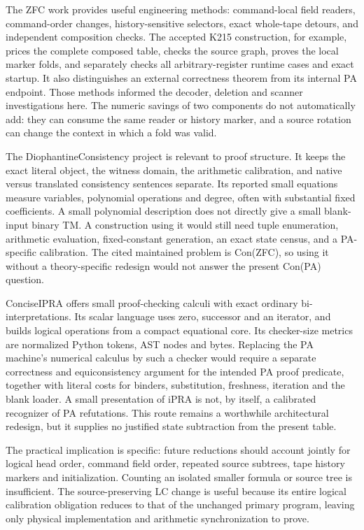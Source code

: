 \documentclass[11pt,a4paper]{article}
\begin{document}
The ZFC work provides useful engineering methods: command-local field
readers, command-order changes, history-sensitive selectors, exact
whole-tape detours, and independent composition checks. The accepted
K215 construction, for example, prices the complete composed table,
checks the source graph, proves the local marker folds, and separately
checks all arbitrary-register runtime cases and exact startup. It also
distinguishes an external correctness theorem from its internal PA
endpoint.\cite{zfc} Those methods informed the decoder, deletion and
scanner investigations here. The numeric savings of two components do
not automatically add: they can consume the same reader or history
marker, and a source rotation can change the context in which a fold
was valid.

The DiophantineConsistency project is relevant to proof structure. It
keeps the exact literal object, the witness domain, the arithmetic
calibration, and native versus translated consistency sentences separate.
Its reported small equations measure variables, polynomial operations
and degree, often with substantial fixed coefficients.\cite{diophantine}
A small polynomial description does not directly give a small blank-input
binary TM. A construction using it would still need tuple enumeration,
arithmetic evaluation, fixed-constant generation, an exact state census,
and a PA-specific calibration. The cited maintained problem is Con(ZFC),
so using it without a theory-specific redesign would not answer the
present Con(PA) question.

ConciseIPRA offers small proof-checking calculi with exact ordinary
bi-interpretations. Its scalar language uses zero, successor and an
iterator, and builds logical operations from a compact equational
core.\cite{concise-ipra} Its checker-size metrics are normalized Python
tokens, AST nodes and bytes. Replacing the PA machine's numerical
calculus by such a checker would require a separate correctness and
equiconsistency argument for the intended PA proof predicate, together
with literal costs for binders, substitution, freshness, iteration and
the blank loader. A small presentation of iPRA is not, by itself, a
calibrated recognizer of PA refutations. This route remains a worthwhile
architectural redesign, but it supplies no justified state subtraction
from the present table.

The practical implication is specific: future reductions should account
jointly for logical head order, command field order, repeated source
subtrees, tape history markers and initialization. Counting an isolated
smaller formula or source tree is insufficient. The source-preserving LC
change is useful because its entire logical calibration obligation
reduces to that of the unchanged primary program, leaving only physical
implementation and arithmetic synchronization to prove.
\end{document}
